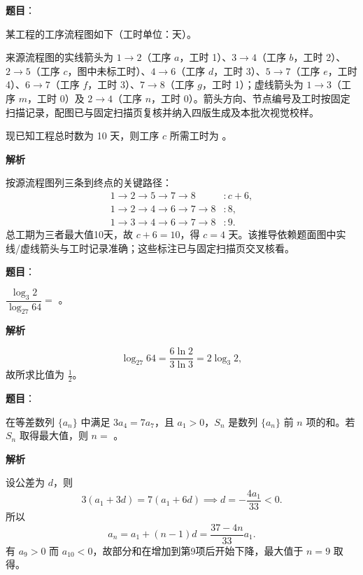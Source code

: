 \begin{answer}

\textbf{题目}：

某工程的工序流程图如下（工时单位：天）。
\nopagebreak[4]
\begin{center}\end{center}
\nopagebreak[4]
来源流程图的实线箭头为 $1\to2$（工序 $a$，工时 1）、$3\to4$（工序 $b$，工时 2）、$2\to5$（工序 $c$，图中未标工时）、$4\to6$（工序 $d$，工时 3）、$5\to7$（工序 $e$，工时 4）、$6\to7$（工序 $f$，工时 3）、$7\to8$（工序 $g$，工时 1）；虚线箭头为 $1\to3$（工序 $m$，工时 0）及 $2\to4$（工序 $n$，工时 0）。箭头方向、节点编号及工时按固定扫描记录，配图已与固定扫描页复核并纳入四版生成及本批次视觉校样。

现已知工程总时数为 10 天，则工序 $c$ 所需工时为 \gkblank{}。

\textbf{解析}

按源流程图列三条到终点的关键路径：
\nopagebreak[4]
\[
\begin{aligned}
1\to2\to5\to7\to8 &: c+6,\\
1\to2\to4\to6\to7\to8 &: 8,\\
1\to3\to4\to6\to7\to8 &: 9.
\end{aligned}
\]
总工期为三者最大值10天，故 $c+6=10$，得 $c=4$ 天。该推导依赖题面图中实线/虚线箭头与工时记录准确；这些标注已与固定扫描页交叉核看。


\end{answer}
\begin{answer}

\textbf{题目}：

$\dfrac{\log_3 2}{\log_{27}64}=$ \gkblank{}。

\textbf{解析}

\nopagebreak[4]
\[
\log_{27}64=\frac{6\ln2}{3\ln3}=2\log_3 2,
\]
故所求比值为 $\frac12$。


\end{answer}
\begin{answer}

\textbf{题目}：

在等差数列 $\{a_n\}$ 中满足 $3a_4=7a_7$，且 $a_1>0$，$S_n$ 是数列 $\{a_n\}$ 前 $n$ 项的和。若 $S_n$ 取得最大值，则 $n=$ \gkblank{}。

\textbf{解析}

设公差为 $d$，则
\nopagebreak[4]
\[
3(a_1+3d)=7(a_1+6d)\implies d=-\frac{4a_1}{33}<0.
\]
所以
\nopagebreak[4]
\[
a_n=a_1+(n-1)d=\frac{37-4n}{33}a_1.
\]
有 $a_9>0$ 而 $a_{10}<0$，故部分和在增加到第9项后开始下降，最大值于 $n=9$ 取得。


\end{answer}

